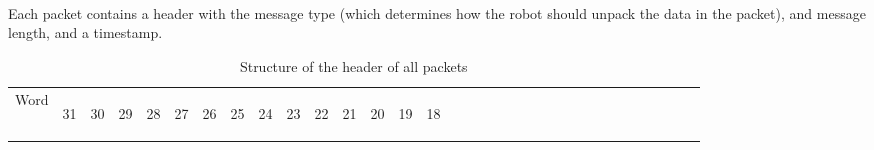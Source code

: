 \documentclass[11pt]{article}
\begin{document}
\paragraph{}
Each packet contains a header with the message type (which determines how the robot should unpack the data in the packet),
and message length, and a timestamp.
\newline
\begin{table}[h!]
    \centering
    \label{tab:headerDef}
    \caption{Structure of the header of all packets}
    \begin{tabular}{|p{1cm}|m{0.04cm}|m{0.04cm}|m{0.04cm}|m{0.04cm}|m{0.04cm}|m{0.04cm}|m{0.04cm}|m{0.04cm}|m{0.04cm}|
        m{0.04cm}|m{0.04cm}|m{0.04cm}|m{0.04cm}|m{0.04cm}|m{0.04cm}|m{0.04cm}|m{0.04cm}|m{0.04cm}|m{0.04cm}|m{0.04cm}|
        m{0.04cm}|m{0.04cm}|m{0.04cm}|m{0.04cm}|m{0.04cm}|m{0.04cm}|m{0.04cm}|m{0.04cm}|m{0.04cm}|m{0.04cm}|m{0.04cm}|m{0.04cm}|}
        \hline
        Word & 
        \begin{sideways}31\end{sideways} &
        \begin{sideways}30\end{sideways} & 
        \begin{sideways}29\end{sideways} &
        \begin{sideways}28\end{sideways} &
        \begin{sideways}27\end{sideways} &
        \begin{sideways}26\end{sideways} &
        \begin{sideways}25\end{sideways} &
        \begin{sideways}24\end{sideways} &
        \begin{sideways}23\end{sideways} &
        \begin{sideways}22\end{sideways} &
        \begin{sideways}21\end{sideways} &
        \begin{sideways}20\end{sideways} &
        \begin{sideways}19\end{sideways} &
        \begin{sideways}18\end{sideways} &

\end{tabular}
\end{table}
\end{document}
